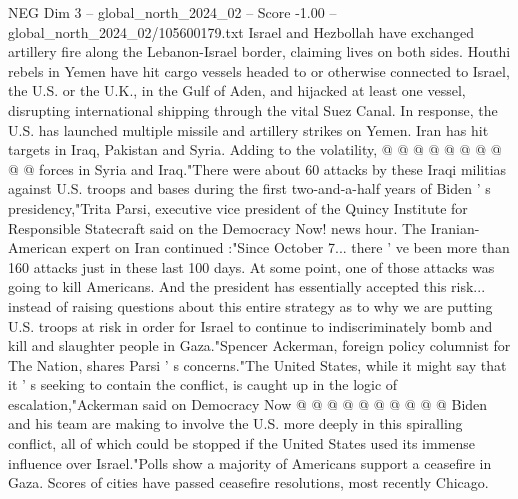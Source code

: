 \begin{textsample}{NEG Dim 3 – global\_north\_2024\_02 – Score -1.00 – global\_north\_2024\_02/105600179.txt}
Israel and Hezbollah have exchanged artillery fire along the Lebanon-Israel border, claiming lives on both sides.
Houthi rebels in Yemen have hit cargo vessels headed to or otherwise connected to Israel, the U.S. or the U.K., in the Gulf of Aden, and hijacked at least one vessel, disrupting international shipping through the vital Suez Canal.
In response, the U.S. has launched multiple missile and artillery strikes on Yemen.
Iran has hit targets in Iraq, Pakistan and Syria.
Adding to the volatility, @ @ @ @ @ @ @ @ @ @ forces in Syria and Iraq."There were about 60 attacks by these Iraqi militias against U.S. troops and bases during the first two-and-a-half years of Biden ' s presidency,"Trita Parsi, executive vice president of the Quincy Institute for Responsible Statecraft said on the Democracy Now! news hour.
The Iranian-American expert on Iran continued :"Since October 7... there ' ve been more than 160 attacks just in these last 100 days.
At some point, one of those attacks was going to kill Americans.
And the president has essentially accepted this risk... instead of raising questions about this entire strategy as to why we are putting U.S. troops at risk in order for Israel to continue to indiscriminately bomb and kill and slaughter people in Gaza."Spencer Ackerman, foreign policy columnist for The Nation, shares Parsi ' s concerns."The United States, while it might say that it ' s seeking to contain the conflict, is caught up in the logic of escalation,"Ackerman said on Democracy Now @ @ @ @ @ @ @ @ @ @ Biden and his team are making to involve the U.S. more deeply in this spiralling conflict, all of which could be stopped if the United States used its immense influence over Israel."Polls show a majority of Americans support a ceasefire in Gaza.
Scores of cities have passed ceasefire resolutions, most recently Chicago.

\end{textsample}
